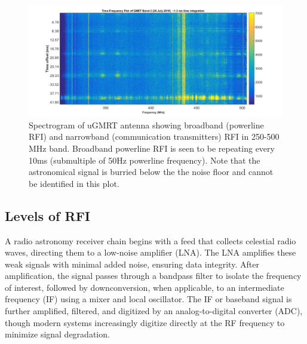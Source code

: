 \begin{figure}
    \centering
    \includegraphics[scale=0.25]{Hardware Excision Techniques/figures/time_freq(1).jpg}
    \caption{Spectrogram of uGMRT \citep{gupta2017upgraded} antenna showing broadband (powerline RFI) and narrowband (communication transmitters) RFI in 250-500 MHz band. Broadband powerline RFI is seen to be repeating every 10ms (submultiple of 50Hz powerline frequency). Note that the astronomical signal is burried below the the noise floor and cannot be identified in this plot.}
    \label{fig:ugmrt-rfi}
\end{figure}




\subsection{Levels of RFI}
\label{subsection:hardware:introduction: levels}
A radio astronomy receiver chain begins with a feed that collects celestial radio waves, directing them to a low-noise amplifier (LNA). The LNA amplifies these weak signals with minimal added noise, ensuring data integrity. After amplification, the signal passes through a bandpass filter to isolate the frequency of interest, followed by downconversion, when applicable, to an intermediate frequency (IF) using a mixer and local oscillator. The IF or baseband signal is further amplified, filtered, and digitized by an analog-to-digital converter (ADC), though modern systems increasingly digitize directly at the RF frequency to minimize signal degradation.

